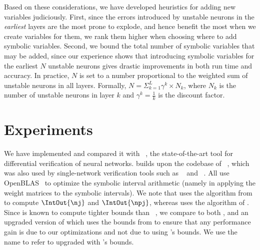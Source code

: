 Based on these considerations, we have developed heuristics for adding
new variables judiciously.
%
First, since the errors introduced by unstable neurons in
the \emph{earliest} layers are the most prone to explode, and hence
benefit the most when we create variables for them, we
rank them higher when choosing where to add symbolic variables.
%
Second, we bound the total number of symbolic variables that may be
added, since our experience shows that introducing symbolic variables
for the earliest $ N $ unstable neurons gives drastic improvements in
both run time and accuracy.
%
In practice, $N$ is set to a number proportional
to the weighted sum of unstable neurons in all layers. Formally,
$N=\Sigma_{k=1}^L \gamma^k \times N_k$, where $N_k$ is the number of
unstable neurons in layer $k$ and $\gamma^k = \frac{1}{k}$ is the discount
factor.
%



\section{Experiments}
\label{neurodiff:sec:experiment}


We have implemented \Name{} and compared it
with \ReluDiff{}~\cite{paulsen2020reludiff}, the state-of-the-art tool for
differential verification of neural networks.
%
\Name{} builds upon the codebase of \ReluDiff{}~\cite{reludiffrepo},
which was also used by single-network verification tools such
as \ReluVal{}~\cite{WangPWYJ18} and \Neurify{}~\cite{WangPWYJ18nips}.
All use OpenBLAS~\cite{ZhangWZ12} to optimize the symbolic
interval arithmetic (namely in applying the weight matrices to the
symbolic intervals).
%
We note that \Name{} uses the algorithm from \Neurify{} to compute
$ \IntOut{\nj} $ and $ \IntOut{\npj} $, whereas \ReluDiff{} uses
the algorithm of \ReluVal{}. Since \Neurify{} is known to compute
tighter bounds than \ReluVal{}~\cite{WangPWYJ18nips},
we compare to both \ReluDiff{}, and an upgraded version of \ReluDiff{}
which uses the bounds from \Neurify{} to ensure
that any performance gain is due to our optimizations and not due to
using \Neurify{}'s bounds. We use the name \ReluDiffP{} to refer
to \ReluDiff{} upgraded with \Neurify{}'s bounds.
%


